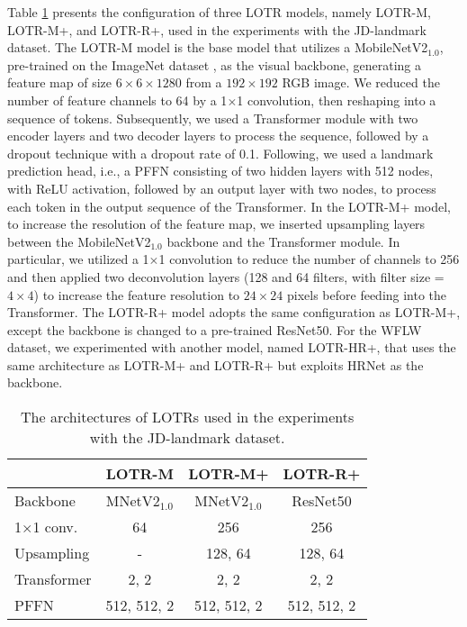 \documentclass[journal]{IEEEtran}
\begin{document}
Table \ref{tab:lotr_models} presents the configuration of three LOTR models, namely LOTR-M, LOTR-M+, and LOTR-R+, used in the experiments with the JD-landmark dataset. 
The LOTR-M model is the base model that utilizes a MobileNetV2$_{1.0}$, pre-trained on the ImageNet dataset \cite{imagenet09}, as the visual backbone, generating a feature map of size $6\times6\times1280$ from a $192\times192$ RGB image. 
We reduced the number of feature channels to 64 by a 1$\times$1 convolution, then reshaping into a sequence of tokens.
Subsequently, we used a Transformer module with two encoder layers and two decoder layers to process the sequence, followed by a dropout technique \cite{srivastava14a} with a dropout rate of 0.1.
Following, we used a landmark prediction head, i.e., a PFFN consisting of two hidden layers with 512 nodes, with ReLU activation, followed by an output layer with two nodes, to process each token in the output sequence of the Transformer.
In the LOTR-M+ model, to increase the resolution of the feature map, we inserted upsampling layers between the MobileNetV2$_{1.0}$ backbone and the Transformer module.
In particular, we utilized a 1$\times$1 convolution to reduce the number of channels to 256 and then applied two deconvolution layers (128 and 64 filters, with filter size  = $4\times4$) to increase the feature resolution to $24\times24$ pixels before feeding into the Transformer.
The LOTR-R+ model adopts the same configuration as LOTR-M+, except the backbone is changed to a pre-trained ResNet50.
For the WFLW dataset, we experimented with another model, named LOTR-HR+, that uses the same architecture as LOTR-M+ and LOTR-R+ but exploits HRNet \cite{Wang2021HRNet} as the backbone.

\begin{table}
\caption{The architectures of LOTRs used in the experiments with the JD-landmark dataset.}
\centering
\begin{tabular}{lccc}
\hline
                 & LOTR-M & LOTR-M+ & LOTR-R+ \\
\hline
Backbone         & MNetV2$_{1.0}$ & MNetV2$_{1.0}$ & ResNet50 \\
1$\times$1 conv. & 64 & 256 & 256 \\
Upsampling       & - & 128, 64 & 128, 64 \\
\hline
Transformer      & 2, 2 & 2, 2 & 2, 2 \\
\hline
PFFN             & 512, 512, 2 & 512, 512, 2 & 512, 512, 2 \\
\hline
\end{tabular}
\newline
\label{tab:lotr_models}
\end{table}
\end{document}
